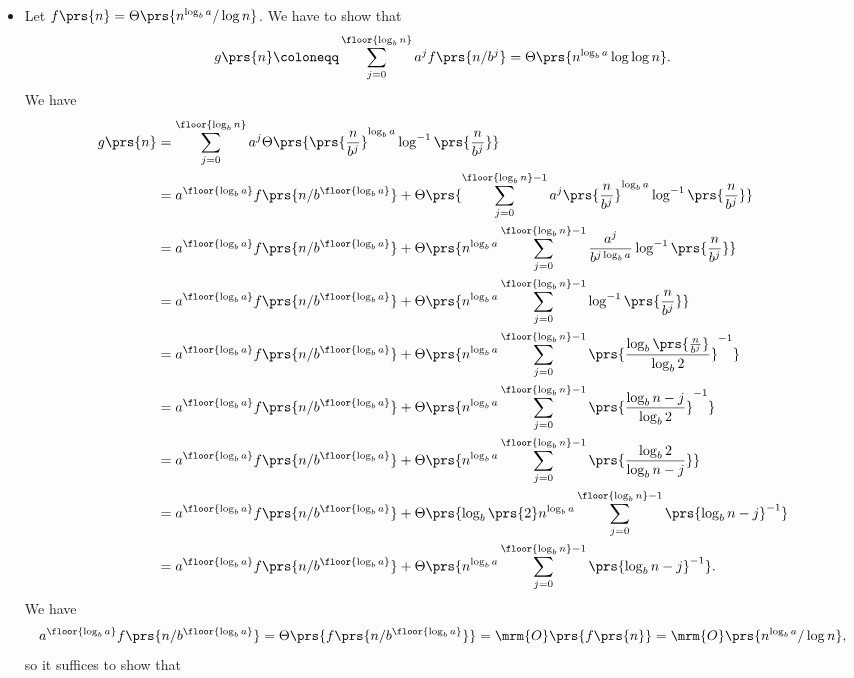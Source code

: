 \documentclass[oneside]{scrbook}
\theoremstyle{definition}
\begin{document}
\begin{exercise}
\begin{itemize}
\item Let $f\prs{n} = \Theta\prs{n^{\log_b a} / \log n}$.
We have to show that
\begin{align*}
g\prs{n} \coloneqq \sum_{j=0}^{\floor{\log_b n}} a^j f\prs{n/b^j} = \Theta\prs{n^{\log_b a} \log \log n} \text{.}
\end{align*}
We have
\begin{align*}
g\prs{n} &= \sum_{j=0}^{\floor{\log_b n}} a^j \Theta\prs{\prs{\frac{n}{b^j}}^{\log_b a} \log^{-1} \prs{\frac{n}{b^j}}}
\\&= a^{\floor{\log_b a}} f\prs{n / b^{\floor{\log_b a}}} + \Theta\prs{\sum_{j=0}^{\floor{\log_b n} - 1} a^j \prs{\frac{n}{b^j}}^{\log_b a} \log^{-1} \prs{\frac{n}{b^j}}}
\\&= a^{\floor{\log_b a}} f\prs{n / b^{\floor{\log_b a}}} + \Theta\prs{n^{\log_b a} \sum_{j=0}^{\floor{\log_b n} - 1} \frac{a^j}{b^{j \log_b a}} \log^{-1} \prs{\frac{n}{b^j}}}
\\&= a^{\floor{\log_b a}} f\prs{n / b^{\floor{\log_b a}}} + \Theta\prs{n^{\log_b a} \sum_{j=0}^{\floor{\log_b n} - 1} \log^{-1}\prs{\frac{n}{b^j}}}
\\&= a^{\floor{\log_b a}} f\prs{n / b^{\floor{\log_b a}}} + \Theta\prs{n^{\log_b a} \sum_{j=0}^{\floor{\log_b n} - 1} \prs{\frac{\log_b \prs{\frac{n}{b^j}}}{\log_b 2}}^{-1}}
\\&= a^{\floor{\log_b a}} f\prs{n / b^{\floor{\log_b a}}} + \Theta\prs{n^{\log_b a} \sum_{j=0}^{\floor{\log_b n} - 1} \prs{\frac{\log_b n - j}{\log_b 2}}^{-1}}
\\&= a^{\floor{\log_b a}} f\prs{n / b^{\floor{\log_b a}}} + \Theta\prs{n^{\log_b a} \sum_{j=0}^{\floor{\log_b n} - 1} \prs{\frac{\log_b 2}{\log_b n - j}}}
\\&= a^{\floor{\log_b a}} f\prs{n / b^{\floor{\log_b a}}} + \Theta\prs{\log_b \prs{2} n^{\log_b a} \sum_{j=0}^{\floor{\log_b n} - 1} \prs{\log_b n - j}^{-1}}
\\&= a^{\floor{\log_b a}} f\prs{n / b^{\floor{\log_b a}}} + \Theta\prs{n^{\log_b a} \sum_{j=0}^{\floor{\log_b n} - 1} \prs{\log_b n - j}^{-1}} \text{.}
\end{align*}
We have
\begin{align*}
a^{\floor{\log_b a}} f\prs{n / b^{\floor{\log_b a}}} = \Theta\prs{f\prs{n / b^{\floor{\log_b a}}}} = \mrm{O}\prs{f\prs{n}} = \mrm{O}\prs{n^{\log_b a} / \log n} \text{,}
\end{align*}
so it suffices to show that

\end{itemize}
\end{exercise}
\end{document}
